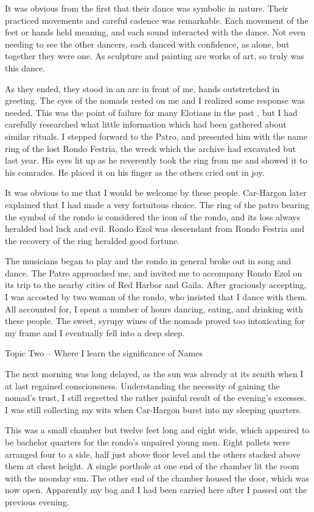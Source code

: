It was obvious from the first that their dance was symbolic in nature. Their practiced movements and careful cadence was remarkable. Each movement of the feet or hands held meaning, and each sound interacted with the dance. Not even needing to see the other dancers, each danced with confidence, as alone, but together they were one. As sculpture and painting are works of art, so truly was this dance.

As they ended, they stood in an arc in front of me, hands outstretched in greeting. The eyes of the nomads rested on me and I realized some response was needed. This was the point of failure for many Elotians in the past , but I had carefully researched what little information which had been gathered about similar rituals. I stepped forward to the Patro, and presented him with the name ring of the lost Rondo Festria, the wreck which the archive had excavated but last year. His eyes lit up as he reverently took the ring from me and showed it to his comrades. He placed it on his finger as the others cried out in joy.

It was obvious to me that I would be welcome by these people. Car-Hargon later explained that I had made a very fortuitous choice. The ring of the patro bearing the symbol of the rondo is considered the icon of the rondo, and its loss always heralded bad luck and evil. Rondo Ezol was descendant from Rondo Festria and the recovery of the ring heralded good fortune.

The musicians began to play and the rondo in general broke out in song and dance. The Patro approached me, and invited me to accompany Rondo Ezol on its trip to the nearby cities of Red Harbor and Gaila. After graciously accepting, I was accosted by two woman of the rondo, who insisted that I dance with them. All accounted for, I spent a number of hours dancing, eating, and drinking with these people. The sweet, syrupy wines of the nomads proved too intoxicating for my frame and I eventually fell into a deep sleep.

Topic Two – Where I learn the significance of Names

The next morning was long delayed, as the sun was already at its zenith when I at last regained consciousness. Understanding the necessity of gaining the nomad's trust, I still regretted the rather painful result of the evening's excesses. I was still collecting my wits when Car-Hargon burst into my sleeping quarters.

This was a small chamber but twelve feet long and eight wide, which appeared to be bachelor quarters for the rondo's unpaired young men. Eight pallets were arranged four to a side, half just above floor level and the others stacked above them at chest height. A single porthole at one end of the chamber lit the room with the noonday sun. The other end of the chamber housed the door, which was now open. Apparently my bag and I had been carried here after I passed out the previous evening.

